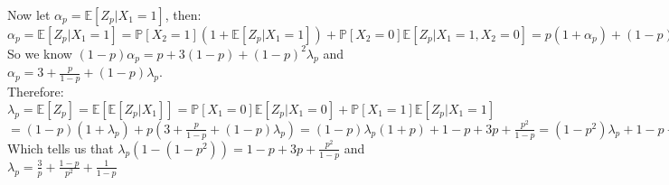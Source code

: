 \documentclass{article}
\begin{document}
\begin{center}
    \\Now let $\alpha_p =\mathbb{E}[Z_p | X_1 = 1]$, then:
    \\$\alpha_p =\mathbb{E}[Z_p | X_1 = 1] =\mathbb{P}[X_2 = 1](1 +\mathbb{E}[Z_p | X_1 = 1]) +\mathbb{P}[X_2 = 0]\mathbb{E}[Z_p | X_1 = 1, X_2 = 0] = p(1 +\alpha_p) + (1 - p)(3 + (1 - p)\lambda_p)$
    \\So we know $(1 - p)\alpha_p = p + 3(1 - p) + (1 - p)^2\lambda_p$ and $\alpha_p = 3 +\frac{p}{1-p} + (1 - p)\lambda_p$.
    \\Therefore:
    \\$\lambda_p =\mathbb{E}[Z_p] =\mathbb{E}[\mathbb{E}[Z_p|X_1]] =\mathbb{P}[X_1 = 0]\mathbb{E}[Z_p|X_1 = 0] +\mathbb{P}[X_1 = 1]\mathbb{E}[Z_p|X_1 = 1]$
    \\$= (1 - p)(1 +\lambda_p) + p(3 +\frac{p}{1-p} + (1 - p)\lambda_p) = (1 - p)\lambda_p (1 + p) + 1 - p + 3p +\frac{p^2}{1 - p} = (1 - p^2)\lambda_p + 1 - p + 3p +\frac{p^2}{1 - p}$
    \\Which tells us that $\lambda_p (1 - (1 - p^2)) = 1 - p + 3p +\frac{p^2}{1 - p}$ and $\lambda_p =\frac{3}{p} +\frac{1 - p}{p^2} +\frac{1}{1 - p}$ \qedsymbol
\end{center}
\end{document}
